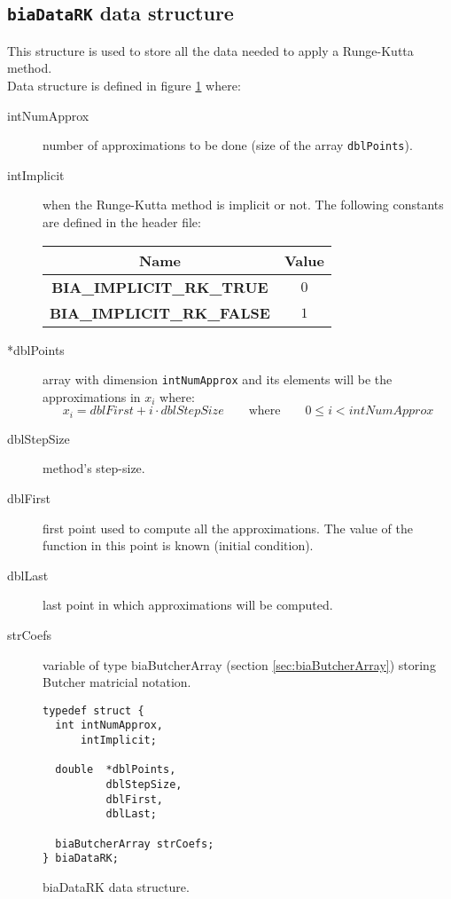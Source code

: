\subsection{\texttt{biaDataRK} data structure}

This structure is used to store all the data needed to apply a Runge-Kutta method.\\

Data structure is defined in figure \ref{fig:biaDataRK} where:
%
\begin{description}
%
\item[intNumApprox] number of approximations to be done (size of the array \texttt{dblPoints}).
%
\item[intImplicit] when the Runge-Kutta method is implicit or not. The following constants are defined in the header file:
%
\begin{center}
\begin{tabular}{|c|c|}
\hline
\textbf{Name} & \textbf{Value} \\
\hline
\textbf{BIA\_IMPLICIT\_RK\_TRUE} & $0$ \\
\hline
\textbf{BIA\_IMPLICIT\_RK\_FALSE} & $1$ \\
\hline
\end{tabular}
\end{center}  
%
\item[*dblPoints] array with dimension \texttt{intNumApprox} and its elements will be the approximations in $x_i$ where:
%
\begin{displaymath}
x_i = dblFirst + i \cdot dblStepSize \qquad \textrm{where} \qquad 0 \le i < intNumApprox     
\end{displaymath}
%
\item[dblStepSize] method's step-size.
%
\item[dblFirst] first point used to compute all the approximations. The value of the function in this point is known (initial condition).
%
\item[dblLast] last point in which approximations will be computed.
%
\item[strCoefs] variable of type biaButcherArray (section \ref{sec:biaButcherArray}) storing Butcher matricial notation.
%
\end{description}

\begin{figure}[!h]
\begin{verbatim}
typedef struct {
  int intNumApprox,
      intImplicit;

  double  *dblPoints,
          dblStepSize,
          dblFirst,
          dblLast;

  biaButcherArray strCoefs;
} biaDataRK;
\end{verbatim}
\caption{biaDataRK data structure.} \label{fig:biaDataRK}
\end{figure}
%
\FloatBarrier

